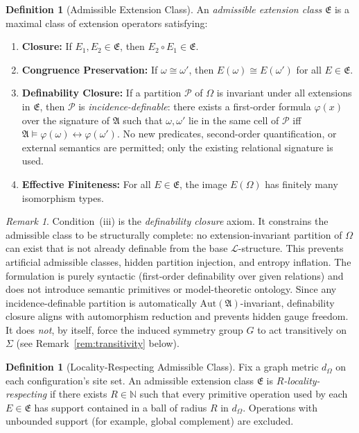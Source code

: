\documentclass[11pt,a4paper]{article}
\theoremstyle{definition}
\newtheorem{definition}[theorem]{Definition}
\theoremstyle{remark}
\newtheorem{remark}[theorem]{Remark}
\begin{document}
\begin{definition}[Admissible Extension Class]\label{def:admiss}
An \emph{admissible extension class} $\mathfrak{E}$ is a maximal class of extension operators satisfying:
\begin{enumerate}[label=(\roman*)]
  \item \textbf{Closure:} If $E_1, E_2 \in \mathfrak{E}$, then $E_2 \circ E_1 \in \mathfrak{E}$.
  \item \textbf{Congruence Preservation:} If $\omega \cong \omega'$, then $E(\omega) \cong E(\omega')$ for all $E \in \mathfrak{E}$.
  \item \textbf{Definability Closure:} If a partition $\mathcal{P}$ of $\Omega$ is invariant under all extensions in $\mathfrak{E}$, then $\mathcal{P}$ is \emph{incidence-definable}: there exists a first-order formula $\varphi(x)$ over the signature of $\mathfrak{A}$ such that $\omega, \omega'$ lie in the same cell of $\mathcal{P}$ iff $\mathfrak{A} \models \varphi(\omega) \leftrightarrow \varphi(\omega')$. No new predicates, second-order quantification, or external semantics are permitted; only the existing relational signature is used.
  \item \textbf{Effective Finiteness:} For all $E \in \mathfrak{E}$, the image $E(\Omega)$ has finitely many isomorphism types.
\end{enumerate}
\end{definition}

\begin{remark}
Condition~(iii) is the \emph{definability closure} axiom. It constrains the admissible class to be structurally complete: no extension-invariant partition of $\Omega$ can exist that is not already definable from the base $\mathcal{L}$-structure. This prevents artificial admissible classes, hidden partition injection, and entropy inflation. The formulation is purely syntactic (first-order definability over given relations) and does not introduce semantic primitives or model-theoretic ontology. Since any incidence-definable partition is automatically $\mathrm{Aut}(\mathfrak{A})$-invariant, definability closure aligns with automorphism reduction and prevents hidden gauge freedom. It does \emph{not}, by itself, force the induced symmetry group $G$ to act transitively on $\Sigma$ (see Remark~\ref{rem:transitivity} below).
\end{remark}

\begin{definition}[Locality-Respecting Admissible Class]\label{def:local-class}
Fix a graph metric $d_\Omega$ on each configuration's site set. An admissible extension class $\mathfrak{E}$ is \emph{$R$-locality-respecting} if there exists $R \in \mathbb{N}$ such that every primitive operation used by each $E \in \mathfrak{E}$ has support contained in a ball of radius $R$ in $d_\Omega$. Operations with unbounded support (for example, global complement) are excluded.
\end{definition}
\end{document}
